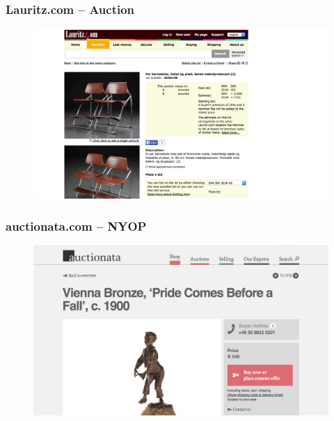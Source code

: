 \documentclass[mathserif,serif]{beamer}
\begin{document}
	\begin{frame}
		\frametitle{Lauritz.com -- Auction}
		\begin{figure}[plain]
			\hspace*{-11mm}
			\includegraphics[width=1\paperwidth]{Figures/Lauritz.jpg}
		\end{figure}
	\end{frame}
	
	\begin{frame}
		\frametitle{auctionata.com -- NYOP}
		\begin{figure}[plain]
			\hspace*{-11mm}
			\includegraphics[width=1\paperwidth]{Figures/Auctionata.jpg}
		\end{figure}
	\end{frame}
	
\end{document}
